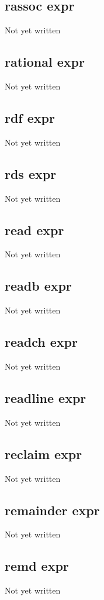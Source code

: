 \documentclass[a4paper,11pt]{article}
\begin{document}
\subsection{\ttfamily rassoc expr}
Not yet written

\subsection{\ttfamily rational expr}
Not yet written

\subsection{\ttfamily rdf expr}
Not yet written

\subsection{\ttfamily rds expr}
Not yet written

\subsection{\ttfamily read expr}
Not yet written

\subsection{\ttfamily readb expr}
Not yet written

\subsection{\ttfamily readch expr}
Not yet written

\subsection{\ttfamily readline expr}
Not yet written

\subsection{\ttfamily reclaim expr}
Not yet written

\subsection{\ttfamily remainder expr}
Not yet written

\subsection{\ttfamily remd expr}
Not yet written
\end{document}
